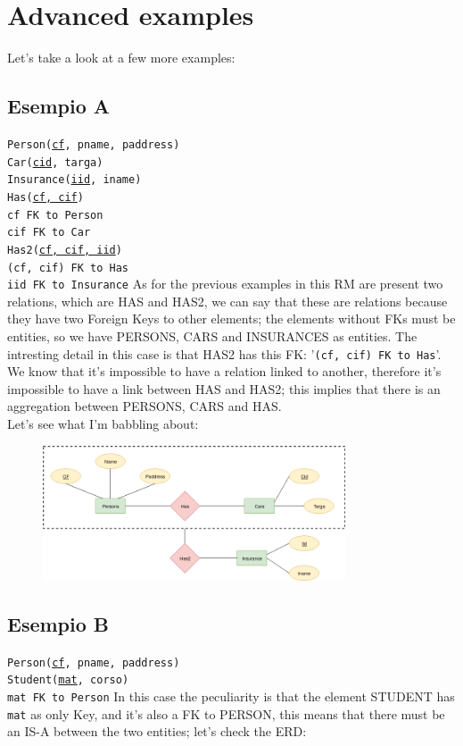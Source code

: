 \documentclass[class=book, crop=false, oneside]{standalone}
\newcommand\tab[1][1cm]{\hspace*{#1}}
\begin{document}
\section{Advanced examples}
Let's take a look at a few more examples:
\subsection*{Esempio A}
\texttt{Person(\underline{cf}, pname, paddress)}\\
\texttt{Car(\underline{cid}, targa)}\\
\texttt{Insurance(\underline{iid}, iname)}\\
\texttt{Has(\underline{cf, cif})}\\
\tab[.4cm] \texttt{cf FK to Person}\\
\tab[.4cm] \texttt{cif FK to Car}\\
\texttt{Has2(\underline{cf, cif, iid})}\\
\tab[.4cm] \texttt{(cf, cif) FK to Has}\\
\tab[.4cm] \texttt{iid FK to Insurance}
\vskip 8pt
As for the previous examples in this RM are present two relations, which are HAS and HAS2, we can say that these are relations because they have two Foreign Keys to other elements; the elements without FKs must be entities, so we have PERSONS, CARS and INSURANCES as entities.
The intresting detail in this case is that HAS2 has this FK: '\texttt{(cf, cif) FK to Has}'.\\
We know that it's impossible to have a relation linked to another, therefore it's impossible to have a link between HAS and HAS2; this implies that there is an aggregation between PERSONS, CARS and HAS.\\
Let's see what I'm babbling about:
\begin{figure}[H]
	\includegraphics[width=0.8\textwidth,keepaspectratio]{diagram6_00.png}
	\label{diagram6_00}
\end{figure}

\subsection*{Esempio B}
\texttt{Person(\underline{cf}, pname, paddress)}\\
\texttt{Student(\underline{mat}, corso)}\\
\tab[.4cm] \texttt{mat FK to Person}
\vskip 8pt
In this case the peculiarity is that the element STUDENT has \texttt{mat} as only Key, and it's also a FK to PERSON, this means that there must be an IS-A between the two entities; let's check the ERD:
\end{document}

